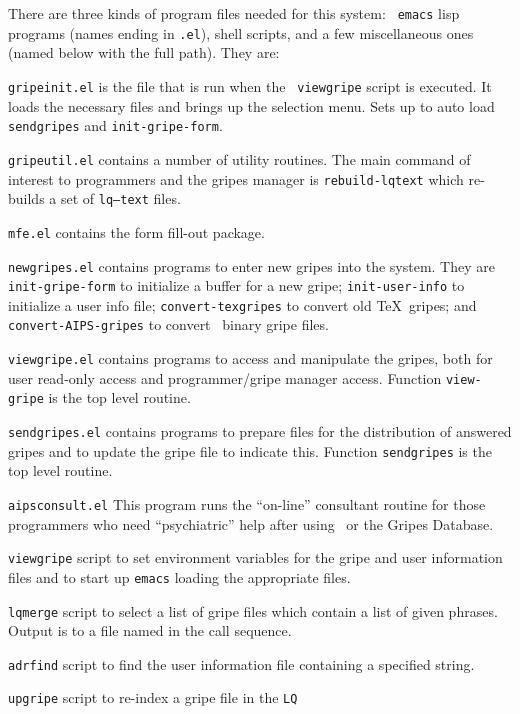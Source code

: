 There are three kinds of program files needed for this system: {\tt
emacs} lisp programs (names ending in {\tt .el}), shell scripts, and a
few miscellaneous ones (named below with the full path).  They are:
\begin{description}
\item{{\tt gripeinit.el}} is the file that is run when the {\tt
    viewgripe} script is executed.  It loads the necessary files and
    brings up the selection menu.  Sets up to auto load {\tt
    sendgripes} and {\tt init-gripe-form}.
\item{{\tt gripeutil.el}} contains a number of utility routines.
    The main command of interest to programmers and the gripes manager
    is {\tt rebuild-lqtext} which re-builds a set of {\tt lq--text}
    files.
\item{{\tt mfe.el}} contains the form fill-out package.
\item{{\tt newgripes.el}} contains programs to enter new gripes into
    the system.  They are {\tt init-gripe-form} to initialize a buffer
    for a new gripe; {\tt init-user-info} to initialize a user info
    file; {\tt convert-texgripes} to convert old \TeX\ gripes; and
    {\tt convert-AIPS-gripes} to convert \AIPS\ binary gripe files.
\item{{\tt viewgripe.el}} contains programs to access and manipulate
    the gripes, both for user read-only access and programmer/gripe
    manager access.  Function {\tt view-gripe} is the top level
    routine.
\item{{\tt sendgripes.el}} contains programs to prepare files for the
    distribution of answered gripes and to update the gripe file to
    indicate this.  Function {\tt sendgripes} is the top level
    routine.
\item{{\tt aipsconsult.el}} This program runs the ``on-line''
    consultant routine for those programmers who need ``psychiatric''
    help after using \AIPS\ or the Gripes Database.
\item{{\tt viewgripe}} script to set environment variables for the
    gripe and user information files and to start up {\tt emacs}
    loading the appropriate files.
\item{{\tt lqmerge}} script to select a list of gripe files which
    contain a list of given phrases.  Output is to a file named in the
    call sequence.
\item{{\tt adrfind}} script to find the user information file
    containing a specified string.
\item{{\tt upgripe}} script to re-index a gripe file in the {\tt LQ}

\end{description}

